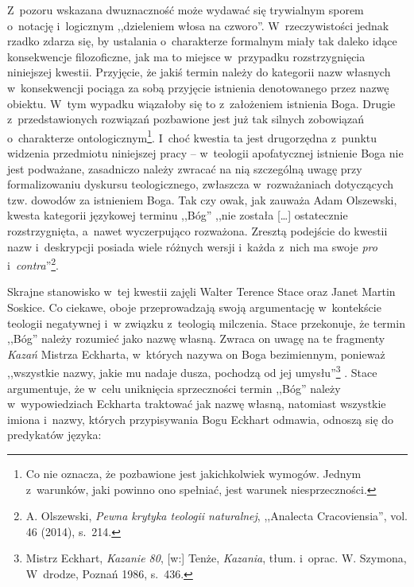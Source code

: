 Z~pozoru wskazana dwuznaczność może wydawać się trywialnym sporem o~notację i~logicznym ,,dzieleniem włosa na czworo''. W~rzeczywistości jednak rzadko zdarza się, by ustalania o~charakterze formalnym miały tak daleko idące konsekwencje filozoficzne, jak ma to miejsce w~przypadku rozstrzygnięcia niniejszej kwestii. Przyjęcie, że jakiś termin należy do kategorii nazw własnych w~konsekwencji pociąga za sobą przyjęcie istnienia denotowanego przez nazwę obiektu. W~tym wypadku wiązałoby się to z~założeniem istnienia Boga. Drugie z~przedstawionych rozwiązań pozbawione jest już tak silnych zobowiązań o~charakterze ontologicznym\footnote{Co nie oznacza, że pozbawione jest jakichkolwiek wymogów. Jednym z~warunków, jaki powinno ono spełniać, jest warunek niesprzeczności.}. I~choć kwestia ta jest drugorzędna z~punktu widzenia przedmiotu niniejszej pracy -- w~teologii apofatycznej istnienie Boga nie jest podważane, zasadniczo należy zwracać na nią szczególną uwagę przy formalizowaniu dyskursu teologicznego, zwłaszcza w~rozważaniach dotyczących tzw. dowodów za istnieniem Boga. Tak czy owak, jak zauważa Adam Olszewski, kwesta kategorii językowej terminu ,,Bóg'' ,,nie została [\ldots] ostatecznie rozstrzygnięta, a~nawet wyczerpująco rozważona. Zresztą podejście do kwestii nazw i~deskrypcji posiada wiele różnych wersji i~każda z~nich ma swoje \textit{pro} i~\textit{contra}''\footnote{A. Olszewski, \textit{Pewna krytyka teologii naturalnej}, ,,Analecta Cracoviensia'', vol. 46 (2014), s.~214.}.

Skrajne stanowisko w~tej kwestii zajęli Walter Terence Stace oraz Janet Martin Soskice. Co ciekawe, oboje przeprowadzają swoją argumentację w~kontekście teologii negatywnej i~w związku z~teologią milczenia. Stace przekonuje, że termin ,,Bóg'' należy rozumieć jako nazwę własną. Zwraca on uwagę na te fragmenty \textit{Kazań} Mistrza Eckharta, w~których nazywa on Boga bezimiennym, ponieważ ,,wszystkie nazwy, jakie mu nadaje dusza, pochodzą od jej umysłu''\footnote{Mistrz Eckhart, \textit{Kazanie 80}, [w:] Tenże, \textit{Kazania}, tłum. i~oprac. W. Szymona, W~drodze, Poznań 1986, s.~436.} . Stace argumentuje, że w~celu uniknięcia sprzeczności termin ,,Bóg'' należy w~wypowiedziach Eckharta traktować jak nazwę własną, natomiast wszystkie imiona i~nazwy, których przypisywania Bogu Eckhart odmawia, odnoszą się do predykatów języka:

